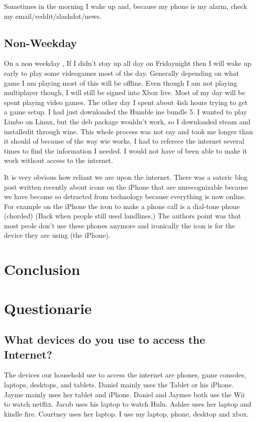 \documentclass[12pt,letterpaper]{article}
\begin{document}
Sometimes in the morning I wake up and, because my phone is my alarm,
check my email/reddit/slashdot/news.


\subsection{Non-Weekday}

On a non weekday , If I didn't stay up all day on Fridaynight then I
will wake up early to play some videogames most of the day. Generally
depending on what game I am playing most of this will be offline. Even
though I am not playing multiplayer though, I will still be signed into
Xbox live. Most of my day will be spent playing video games. The other
day I spent about 4ish hours trying to get a game setup. I had just
downloaded the Humble ine bundle 5. I wanted to play Limbo on Linux, but
the deb package wouldn't work, so I downloaded steam and installedit
through wine. This whole process was not eay and took me longer than it
should of because of the way wie works. I had to referece the internet
several times to find the information I needed. I would not have of been
able to make it work without access to the internet.

It is very obvious how reliant we are upon the internet. There was a
sateric blog post written recently about icons on the iPhone that are
unrecognizable because we have become so detracted from technology
because everything is now online. For example on the iPhone the icon to
make a phone call is a dial-tone phone (chorded) (Back when people still
used landlines.)  The authors point was that most peole don't use these
phones anymore and ironically the icon is for the device they are using
(the iPhone).


\section{Conclusion}

\section{Questionarie}
\subsection{What devices do you use to access the Internet?}
The devices our household use to access the internet are phones, game
consoles, laptops, desktops, and tablets. Daniel mainly uses the Tablet
or his iPhone. Jayme mainly uses her tablet and iPhone. Daniel and
Jaymee both use the Wii to watch netflix. Jacob uses his
laptop to watch Hulu. Ashlee uses her laptop and kindle fire. Courtney uses her
laptop. I use my laptop, phone, desktop and xbox.
\end{document}
